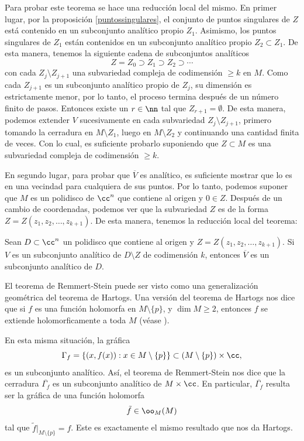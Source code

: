 		Para probar este teorema se hace una reducción local del mismo. En primer lugar, por la proposición \ref{puntossingulares}, el conjunto de puntos singulares de $Z$ está contenido en un subconjunto analítico propio $Z_1$. Asimismo, los puntos singulares de $Z_1$ están contenidos en un subconjunto analítico propio $Z_2\subset Z_1$. De esta manera, tenemos la siguiente cadena de subconjuntos analíticos
		\begin{equation*}
			Z=Z_0\supset Z_1 \supset Z_2 \supset \cdots 
		\end{equation*}
		con cada $Z_j\setminus Z_{j+1}$ una subvariedad compleja de codimensión $\geq k$ en $M$. Como cada $Z_{j+1}$ es un subconjunto analítico propio de $Z_j$, su dimensión es estrictamente menor, por lo tanto, el proceso termina después de un número finito de pasos. Entonces existe un $r\in\nn$ tal que $Z_{r+1}=\emptyset$. De esta manera, podemos extender $V$ sucesivamente en cada subvariedad $Z_{j}\setminus Z_{j+1}$, primero tomando la cerradura en $M\setminus Z_{1}$, luego en $M\setminus Z_2$ y continuando una cantidad finita de veces. Con lo cual, es suficiente probarlo suponiendo que $Z\subset M$ es una subvariedad compleja de codimensión $\geq k$.
		
		En segundo lugar, para probar que $\overline{V}$ es analítico, es suficiente mostrar que lo es en una vecindad para cualquiera de sus puntos. Por lo tanto, podemos suponer que $M$ es un polidisco de $\cc^n$ que contiene al origen y $0\in Z$. Después de un cambio de coordenadas,  podemos ver que la subvariedad $Z$ es de la forma $Z=Z(z_1,z_2,\dots,z_{k+1})$. De esta manera, tenemos la reducción local del teorema:
		
		\begin{propo}
			Sean $D\subset\cc^n$ un polidisco que contiene al origen y $Z=Z(z_1,z_2,\dots,z_{k+1})$. Si $V$ es un subconjunto analítico de $D\setminus Z$ de codimensión $k$, entonces $\overline{V}$ es un subconjunto analítico de $D$.
		\end{propo}
		
		\begin{remark}
			El teorema de Remmert-Stein puede ser visto como una generalización geométrica del teorema de Hartogs. Una versión del teorema de Hartogs nos dice que si $f$ es una función holomorfa en $M\setminus\{p\}$, y $\dim M\geq 2$, entonces $f$ se extiende holomorficamente a toda $M$ (véase \parencite[Chap. 2, Sec. 1, Cor. 2.1.6]{huybrechts2005complex}).
			
			En esta misma situación, la gráfica
			\begin{equation*}
				\Gamma_f=\{(x,f(x)):x\in M\setminus \{p\}\}\subset (M\setminus \{p\})\times \cc,
			\end{equation*}
			es un subconjunto analítico. Así, el teorema de Remmert-Stein nos dice que la cerradura $\overline{\Gamma_f}$ es un subconjunto analítico de $M\times \cc$. En particular, $\overline{\Gamma_f}$ resulta ser la gráfica de una función holomorfa
			\begin{equation*}
				\tilde{f}\in\oo_M(M)
			\end{equation*}
			tal que $\tilde{f}|_{M\setminus\{p\}}=f$. Este es exactamente el mismo resultado que nos da Hartogs. 
		\end{remark}
		
